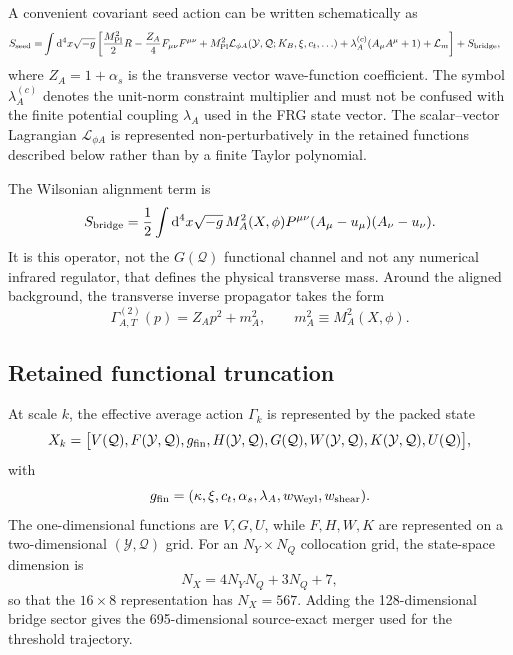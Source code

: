 \documentclass[12pt]{iopart}
\newcommand{\mpl}{M_{\rm Pl}}
\newcommand{\dd}{\mathrm{d}}
\newcommand{\cL}{\mathcal L}
\newcommand{\Q}{\mathcal Q}
\newcommand{\Y}{\mathcal Y}
\begin{document}
A convenient covariant seed action can be written schematically as
\begin{equation}
\begin{split}
S_{\rm seed}=&\int \dd^4x\sqrt{-g}\left[
\frac{\mpl^2}{2}R
-\frac{Z_A}{4}F_{\mu\nu}F^{\mu\nu}
+\mpl^2\cL_{\phi A}(\Y,\Q;K_B,\xi,c_t,\ldots)
+\lambda_A^{(c)}(A_\mu A^\mu+1)
+\cL_m
\right]
+S_{\rm bridge},
\end{split}
\label{eq:seed}
\end{equation}
where $Z_A=1+\alpha_s$ is the transverse vector wave-function coefficient.  The symbol $\lambda_A^{(c)}$ denotes the unit-norm constraint multiplier and must not be confused with the finite potential coupling $\lambda_A$ used in the FRG state vector.  The scalar--vector Lagrangian $\cL_{\phi A}$ is represented non-perturbatively in the retained functions described below rather than by a finite Taylor polynomial.

The Wilsonian alignment term is
\begin{equation}
S_{\rm bridge}=\frac12\int\dd^4x\sqrt{-g}\,
M_A^2(X,\phi)P^{\mu\nu}(A_\mu-u_\mu)(A_\nu-u_\nu).
\label{eq:bridge}
\end{equation}
It is this operator, not the $G(\Q)$ functional channel and not any numerical infrared regulator, that defines the physical transverse mass.  Around the aligned background, the transverse inverse propagator takes the form
\begin{equation}
\Gamma^{(2)}_{A,T}(p)=Z_Ap^2+m_A^2,
\qquad m_A^2\equiv M_A^2(X,\phi).
\label{eq:vectorprop}
\end{equation}

\subsection{Retained functional truncation}

At scale $k$, the effective average action $\Gamma_k$ is represented by the packed state
\begin{equation}
X_k=\big[V(\Q),F(\Y,\Q),g_{\rm fin},H(\Y,\Q),G(\Q),W(\Y,\Q),K(\Y,\Q),U(\Q)\big],
\label{eq:packed}
\end{equation}
with
\begin{equation}
g_{\rm fin}=(\kappa,\xi,c_t,\alpha_s,\lambda_A,w_{\rm Weyl},w_{\rm shear}).
\end{equation}
The one-dimensional functions are $V,G,U$, while $F,H,W,K$ are represented on a two-dimensional $(\Y,\Q)$ grid.  For an $N_Y\times N_Q$ collocation grid, the state-space dimension is
\begin{equation}
N_X=4N_YN_Q+3N_Q+7,
\label{eq:dim}
\end{equation}
so that the $16\times8$ representation has $N_X=567$.  Adding the 128-dimensional bridge sector gives the 695-dimensional source-exact merger used for the threshold trajectory.
\end{document}
